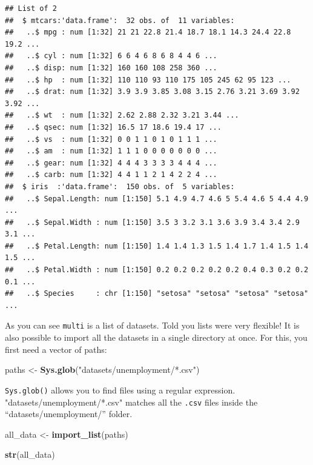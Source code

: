 \documentclass[]{gitbook}
\newenvironment{Shaded}{\begin{snugshade}}{\end{snugshade}}
\newcommand{\KeywordTok}[1]{\textcolor[rgb]{0.13,0.29,0.53}{\textbf{#1}}}
\newcommand{\NormalTok}[1]{#1}
\newcommand{\StringTok}[1]{\textcolor[rgb]{0.31,0.60,0.02}{#1}}
\theoremstyle{definition}
\theoremstyle{definition}
\theoremstyle{definition}
\theoremstyle{remark}
\begin{document}
\begin{verbatim}
## List of 2
##  $ mtcars:'data.frame':  32 obs. of  11 variables:
##   ..$ mpg : num [1:32] 21 21 22.8 21.4 18.7 18.1 14.3 24.4 22.8 19.2 ...
##   ..$ cyl : num [1:32] 6 6 4 6 8 6 8 4 4 6 ...
##   ..$ disp: num [1:32] 160 160 108 258 360 ...
##   ..$ hp  : num [1:32] 110 110 93 110 175 105 245 62 95 123 ...
##   ..$ drat: num [1:32] 3.9 3.9 3.85 3.08 3.15 2.76 3.21 3.69 3.92 3.92 ...
##   ..$ wt  : num [1:32] 2.62 2.88 2.32 3.21 3.44 ...
##   ..$ qsec: num [1:32] 16.5 17 18.6 19.4 17 ...
##   ..$ vs  : num [1:32] 0 0 1 1 0 1 0 1 1 1 ...
##   ..$ am  : num [1:32] 1 1 1 0 0 0 0 0 0 0 ...
##   ..$ gear: num [1:32] 4 4 4 3 3 3 3 4 4 4 ...
##   ..$ carb: num [1:32] 4 4 1 1 2 1 4 2 2 4 ...
##  $ iris  :'data.frame':  150 obs. of  5 variables:
##   ..$ Sepal.Length: num [1:150] 5.1 4.9 4.7 4.6 5 5.4 4.6 5 4.4 4.9 ...
##   ..$ Sepal.Width : num [1:150] 3.5 3 3.2 3.1 3.6 3.9 3.4 3.4 2.9 3.1 ...
##   ..$ Petal.Length: num [1:150] 1.4 1.4 1.3 1.5 1.4 1.7 1.4 1.5 1.4 1.5 ...
##   ..$ Petal.Width : num [1:150] 0.2 0.2 0.2 0.2 0.2 0.4 0.3 0.2 0.2 0.1 ...
##   ..$ Species     : chr [1:150] "setosa" "setosa" "setosa" "setosa" ...
\end{verbatim}

As you can see \texttt{multi} is a list of datasets. Told you lists were
very flexible! It is also possible to import all the datasets in a
single directory at once. For this, you first need a vector of paths:

\begin{Shaded}
\begin{Highlighting}[]
\NormalTok{paths <-}\StringTok{ }\KeywordTok{Sys.glob}\NormalTok{(}\StringTok{"datasets/unemployment/*.csv"}\NormalTok{)}
\end{Highlighting}
\end{Shaded}

\texttt{Sys.glob()} allows you to find files using a regular expression.
"datasets/unemployment/*.csv" matches all the \texttt{.csv} files inside
the ``datasets/unemployment/'' folder.

\begin{Shaded}
\begin{Highlighting}[]
\NormalTok{all_data <-}\StringTok{ }\KeywordTok{import_list}\NormalTok{(paths)}

\KeywordTok{str}\NormalTok{(all_data)}
\end{Highlighting}
\end{Shaded}
\end{document}
